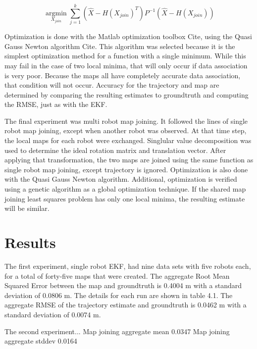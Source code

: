 \documentclass[12pt]{report}
\begin{document}
\begin{equation}
\underset{X_{join}}{\operatorname{argmin}}  \sum \limits_{j=1}^k (\hat{X} - H(X_{join})^T) P^{-1} (\hat{X} - H(X_{join}))
\end{equation}

Optimization is done with the Matlab optimization toolbox {Cite}, using the Quasi Gauss Newton algorithm {Cite}.  This algorithm was selected because it is the simplest optimization method for a function with a single minimum.  While this may fail in the case of two local minima, that will only occur if data association is very poor.  Because the maps all have completely accurate data association, that condition will not occur.  Accuracy for the trajectory and map are determined by comparing the resulting estimates to groundtruth and computing the RMSE, just as with the EKF.

The final experiment was multi robot map joining.  It followed the lines of single robot map joining, except when another robot was observed.  At that time step, the local maps for each robot were exchanged.  Singlular value decomposition was used to determine the ideal rotation matrix and translation vector.  After applying that transformation, the two maps are joined using the same function as single robot map joining, except trajectory is ignored.  Optimization is also done with the Quasi Gauss Newton algorithm.  Additional, optimization is verified using a genetic algorithm as a global optimization technique.  If the shared map joining least squares problem has only one local minima, the resulting estimate will be similar.  

\chapter{Results}

The first experiment, single robot EKF, had nine data sets with five robots each, for a total of forty-five maps that were created.  The aggregate Root Mean Squared Error between the map and groundtruth is 0.4004 m with a standard deviation of 0.0806 m.  The details for each run are shown in table 4.1.   The aggregate RMSE of the trajectory estimate and groundtruth is 0.0462 m with a standard deviation of 0.0074 m.  

The second experiment...
Map joining aggregate mean 0.0347
Map joining aggregate stddev 0.0164
\end{document}
